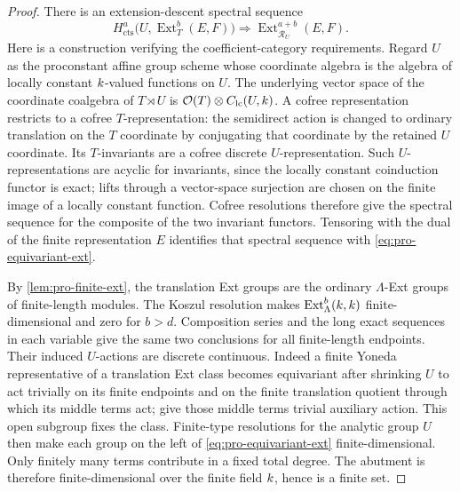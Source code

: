 
\begin{proof}
There is an extension-descent spectral sequence
\begin{equation}
\label{eq:pro-equivariant-ext}
 H^a_{\mathrm{cts}}\bigl(U,
       \operatorname{Ext}^b_T(E,F)\bigr)
 \Longrightarrow\operatorname{Ext}^{a+b}_{\mathcal R_U}(E,F).
\end{equation}
Here is a construction verifying the coefficient-category
requirements.  Regard $U$ as the proconstant affine group scheme
whose coordinate algebra is the algebra of locally constant
$k$-valued functions on $U$.  The underlying vector space of
the coordinate coalgebra of $T\rtimes U$ is
$\mathcal O(T)\otimes C_{\mathrm{lc}}(U,k)$.
A cofree representation restricts to a cofree $T$-representation:
the semidirect action is changed to ordinary translation on the
$T$ coordinate by conjugating that coordinate by the retained
$U$ coordinate.  Its $T$-invariants are a cofree discrete
$U$-representation.  Such $U$-representations are acyclic for
invariants, since the locally constant coinduction functor is
exact; lifts through a vector-space surjection are chosen on the
finite image of a locally constant function.  Cofree resolutions
therefore give the spectral sequence for the composite of the
two invariant functors.  Tensoring with the dual of the finite
representation $E$ identifies that spectral sequence with
\cref{eq:pro-equivariant-ext}.

By \cref{lem:pro-finite-ext}, the translation Ext groups are the
ordinary $\Lambda$-Ext groups of finite-length modules.  The
Koszul resolution makes $\operatorname{Ext}^b_\Lambda(k,k)$
finite-dimensional and zero for $b>d$.  Composition series
and the long exact sequences in each variable give the same
two conclusions for all finite-length endpoints.
Their induced $U$-actions are discrete continuous.  Indeed a
finite Yoneda representative of a translation Ext class becomes
equivariant after shrinking $U$ to act trivially on its finite
endpoints and on the finite translation quotient through which
its middle terms act; give those middle terms trivial auxiliary
action.  This open subgroup fixes the class.  Finite-type
resolutions for the analytic group $U$ then make each group on the left of
\cref{eq:pro-equivariant-ext} finite-dimensional.  Only finitely
many terms contribute in a fixed total degree.  The abutment is
therefore finite-dimensional over the finite field $k$, hence
is a finite set.


\end{proof}

